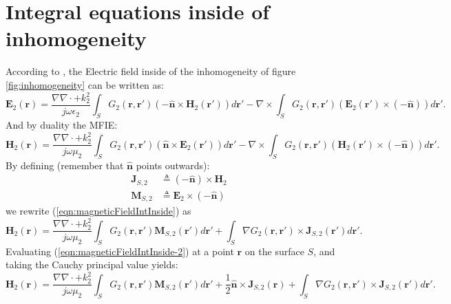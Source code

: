 \documentclass[a4paper,10pt]{book}
\newcommand{\field}[1]{\mathbf{#1}}
\newcommand{\current}[1]{\mathbf{#1}}
\newcommand{\vect}[1]{\mathbf{#1}}
\begin{document}
\section{Integral equations inside of inhomogeneity}
%
\par
According to \cite{Ides2006}, the Electric field inside of the inhomogeneity of figure \ref{fig:inhomogeneity} can be written as:
\begin{equation}\label{eqn:electricFieldIntInside}
\field{E}_2\left(\vect{r}\right) = \frac{\nabla \nabla \cdot + k_2^2}{j \omega \epsilon_2} \int_S G_2(\vect{r}, \vect{r}') \left(-\vect{\hat{n}} \times \field{H}_2\left(\vect{r}'\right) \right) d\vect{r}' - \nabla \times \int_S G_2(\vect{r}, \vect{r}') \left( \field{E}_2\left(\vect{r}'\right) \times \left(-\vect{\hat{n}} \right)\right) d\vect{r}'.
\end{equation}
And by duality the MFIE:
\begin{equation}\label{eqn:magneticFieldIntInside}
\field{H}_2\left(\vect{r}\right) = \frac{\nabla \nabla \cdot + k_2^2}{j \omega \mu_2} \int_S G_2(\vect{r}, \vect{r}') \left(\vect{\hat{n}} \times \field{E}_2\left(\vect{r}'\right) \right) d\vect{r}' - \nabla \times \int_S G_2(\vect{r}, \vect{r}') \left( \field{H}_2\left(\vect{r}'\right) \times \left(-\vect{\hat{n}} \right)\right) d\vect{r}'.
\end{equation}
By defining (remember that $\vect{\hat{n}}$ points outwards):
\begin{align}
\current{J}_{S,2} &\triangleq (-\vect{\hat{n}}) \times \field{H}_2 \\
\current{M}_{S,2} &\triangleq \field{E}_2 \times (-\vect{\hat{n}}) 
\end{align}
we rewrite (\ref{eqn:magneticFieldIntInside}) as 
\begin{equation}\label{eqn:magneticFieldIntInside-2}
\field{H}_2\left(\vect{r}\right) = \frac{\nabla \nabla \cdot + k_2^2}{j \omega \mu_2} \int_S G_2(\vect{r}, \vect{r}') \current{M}_{S,2}\left(\vect{r}'\right) d\vect{r}' + \int_S \nabla G_2(\vect{r}, \vect{r}') \times \current{J}_{S,2}\left(\vect{r}'\right) d\vect{r}'.
\end{equation}
Evaluating (\ref{eqn:magneticFieldIntInside-2}) at a point $\vect{r}$ on the surface $S$, and taking the Cauchy principal value \cite{Arnoldus2011} yields:
\begin{equation}\label{eqn:magneticFieldIntInside-3}
\field{H}_2\left(\vect{r}\right) = \frac{\nabla \nabla \cdot + k_2^2}{j \omega \mu_2} \int_S G_2(\vect{r}, \vect{r}') \current{M}_{S,2}\left(\vect{r}'\right) d\vect{r}' + \frac{1}{2} \vect{\hat{n}} \times \current{J}_{S,2}\left(\vect{r}\right) +  \int_S \nabla G_2(\vect{r}, \vect{r}') \times \current{J}_{S,2}\left(\vect{r}'\right) d\vect{r}'.
\end{equation}
\end{document}
